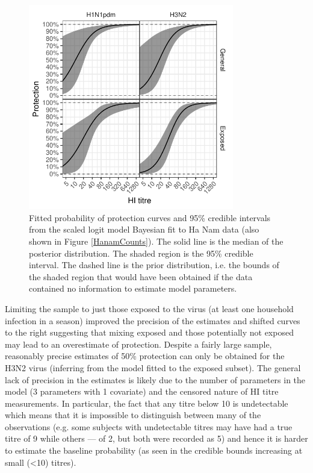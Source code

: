 \documentclass[12pt]{article}
\begin{document}
\begin{figure}[htp]
	\centering
	\includegraphics[width=0.8\textwidth]{../fit-sclr-bayesian-plot/hanam-hi-prot.pdf}
	\caption{
	Fitted probability of protection curves and 95\% credible intervals from the scaled logit model Bayesian fit to Ha Nam data (also shown in Figure \ref{HanamCounts}). The solid line is the median of the posterior distribution. The shaded region is the 95\% credible interval. The dashed line is the prior distribution, i.e. the bounds of the shaded region that would have been obtained if the data contained no information to estimate model parameters.
	}
	\label{SclrBayesProt}
\end{figure}

Limiting the sample to just those exposed to the virus (at least one household infection in a season) improved the precision of the estimates and shifted curves to the right suggesting that mixing exposed and those potentially not exposed may lead to an overestimate of protection. Despite a fairly large sample, reasonably precise estimates of 50\% protection can only be obtained for the H3N2 virus (inferring from the model fitted to the exposed subset). The general lack of precision in the estimates is likely due to the number of parameters in the model (3 parameters with 1 covariate) and the censored nature of HI titre measurements. In particular, the fact that any titre below 10 is undetectable which means that it is impossible to distinguish between many of the observations (e.g. some subjects with undetectable titres may have had a true titre of 9 while others --- of 2, but both were recorded as 5) and hence it is harder to estimate the baseline probability (as seen in the credible bounds increasing at small (<10) titres).
\end{document}

